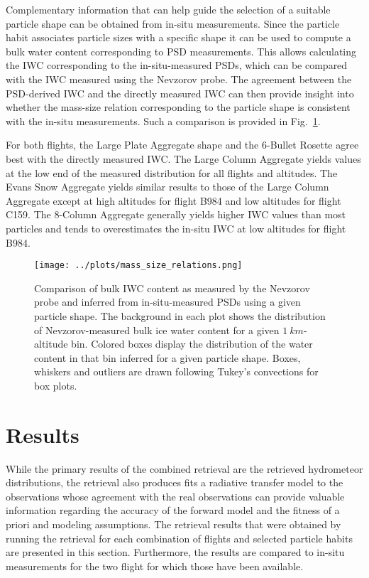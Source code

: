 \documentclass[journal abbreviation, manuscript]{copernicus}
\begin{document}
Complementary information that can help guide the selection of a suitable
particle shape can be obtained from in-situ measurements. Since the particle
habit associates particle sizes with a specific shape it can be used to compute
a bulk water content corresponding to PSD measurements. This allows calculating
the IWC corresponding to the in-situ-measured PSDs, which can be compared with
the IWC measured using the Nevzorov probe. The agreement between the PSD-derived
IWC and the directly measured IWC can then provide insight into whether the
mass-size relation corresponding to the particle shape is consistent with the
in-situ measurements. Such a comparison is provided in
Fig.~\ref{fig:mass_size_relation}.

For both flights, the Large Plate Aggregate shape and the 6-Bullet Rosette agree
best with the directly measured IWC. The Large Column Aggregate yields values at
the low end of the measured distribution for all flights and altitudes. The
Evans Snow Aggregate yields similar results to those of the Large Column
Aggregate except at high altitudes for flight B984 and low altitudes for
flight C159. The 8-Column Aggregate generally yields higher IWC values
than most particles and tends to overestimates the in-situ IWC at low
altitudes for flight B984.

\begin{figure}
  \centering
  \texttt{[image: ../plots/mass\_size\_relations.png]}
  \caption{ Comparison of bulk IWC content as measured by the Nevzorov probe and
    inferred from in-situ-measured PSDs using a given particle shape. The
    background in each plot shows the distribution of Nevzorov-measured bulk ice
    water content for a given $1\ \unit{km}$-altitude bin. Colored boxes display
    the distribution of the water content in that bin inferred for a given
    particle shape. Boxes, whiskers and outliers are drawn following Tukey's convections for box plots.}
  \label{fig:mass_size_relation}
\end{figure}


\section{Results}
\label{sec:results}

While the primary results of the combined retrieval are the retrieved
hydrometeor distributions, the retrieval also produces fits a radiative transfer
model to the observations whose agreement with the real observations can provide
valuable information regarding the accuracy of the forward model and the fitness
of a priori and modeling assumptions. The retrieval results that were obtained
by running the retrieval for each combination of flights and selected particle
habits are presented in this section. Furthermore, the results are compared to
in-situ measurements for the two flight for which those have been available.
\end{document}
